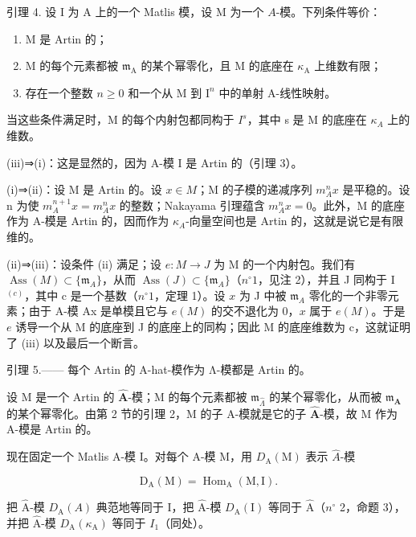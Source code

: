 引理 4. 设 I 为 A 上的一个 Matlis 模，设 M 为一个 \(A\)-模。下列条件等价：

\begin{enumerate}
\def\labelenumi{(\roman{enumi})}
\item
  M 是 Artin 的；
\item
  M 的每个元素都被 \(\mathfrak{m}_{\mathrm{A}}\) 的某个幂零化，且 M 的底座在 \(\kappa_{\mathrm{A}}\) 上维数有限；
\item
  存在一个整数 \(n \geqslant 0\) 和一个从 M 到 \(\mathrm{I}^n\) 中的单射 A-线性映射。
\end{enumerate}

当这些条件满足时，M 的每个内射包都同构于 \(I^{s}\)，其中 s 是 M 的底座在 \(\kappa_{A}\) 上的维数。

(iii)⇒(i)：这是显然的，因为 A-模 I 是 Artin 的（引理 3）。

(i)⇒(ii)：设 M 是 Artin 的。设 \(x \in M\)；M 的子模的递减序列 \(m_{A}^{n}x\) 是平稳的。设 n 为使 \(m_{A}^{n+1}x = m_{A}^{n}x\) 的整数；Nakayama 引理蕴含 \(m_{A}^{n}x = 0\)。此外，M 的底座作为 A-模是 Artin 的，因而作为 \(\kappa_{A}\)-向量空间也是 Artin 的，这就是说它是有限维的。

(ii)⇒(iii)：设条件 (ii) 满足；设 \(e:M\to J\) 为 M 的一个内射包。我们有 \(\operatorname{Ass}(M)\subset\{\mathfrak{m}_{A}\}\)，从而 \(\operatorname{Ass}(J)\subset\{\mathfrak{m}_{A}\}\)（\(n^{\circ} 1\)，见注 2），并且 J 同构于 I \(^{(c)}\)，其中 c 是一个基数（\(n^{\circ} 1\)，定理 1）。设 \(x\) 为 J 中被 \(\mathfrak{m}_{A}\) 零化的一个非零元素；由于 A-模 Ax 是单模且它与 \(e(M)\) 的交不退化为 0，\(x\) 属于 \(e(M)\)。于是 \(e\) 诱导一个从 M 的底座到 J 的底座上的同构；因此 M 的底座维数为 c，这就证明了 (iii) 以及最后一个断言。

引理 5.—— 每个 Artin 的 A-hat-模作为 Λ-模都是 Artin 的。

设 M 是一个 Artin 的 \(\widehat{\mathbf{A}}\)-模；M 的每个元素都被 \(\mathfrak{m}_{\widehat{\Lambda}}\) 的某个幂零化，从而被 \(\mathfrak{m}_{\mathbf{A}}\) 的某个幂零化。由第 2 节的引理 2，M 的子 A-模就是它的子 \(\widehat{\mathbf{A}}\)-模，故 M 作为 A-模是 Artin 的。

现在固定一个 Matlis A-模 I。对每个 A-模 M，用 \(D_{\mathrm{A}}(\mathrm{M})\) 表示 \(\widehat{A}\)-模

\[
\mathrm{D} _ {\mathrm{A}} (\mathrm{M}) = \operatorname{Hom} _ {\mathrm{A}} (\mathrm{M}, \mathrm{I}).
\]

把 \(\widehat{\mathrm{A}}\)-模 \(D_{\mathrm{A}}(A)\) 典范地等同于 I，把 \(\widehat{\mathrm{A}}\)-模 \(D_{\mathrm{A}}(\mathrm{I})\) 等同于 \(\widehat{\mathrm{A}}\)（\(n^{\circ}\) 2，命题 3），并把 \(\widehat{\mathrm{A}}\)-模 \(D_{\mathrm{A}}(\kappa_{\mathrm{A}})\) 等同于 \(I_{1}\)（同处）。

